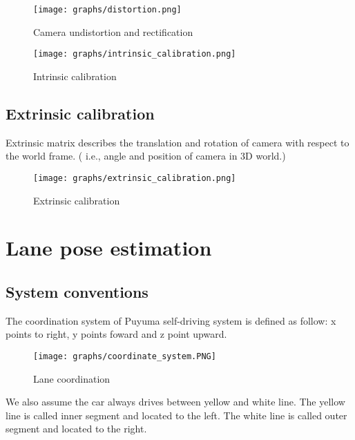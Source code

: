 \documentclass{article}
\begin{document}
\begin{figure}[ht]
  \label{fig:distortion}
  \centering
  \texttt{[image: graphs/distortion.png]}
  \caption{Camera undistortion and rectification}
\end{figure}
\FloatBarrier

\begin{figure}[ht]
  \label{fig:intrinsic_calibration}
  \centering
  \texttt{[image: graphs/intrinsic\_calibration.png]}
  \caption{Intrinsic calibration}
\end{figure}
\FloatBarrier

\subsection{Extrinsic calibration}

Extrinsic matrix describes the translation and rotation of camera with respect to the world frame. ( i.e., angle and position of camera in 3D world.)

\begin{figure}[ht]
  \label{fig:extrinsic_calibration}
  \centering
  \texttt{[image: graphs/extrinsic\_calibration.png]}
  \caption{Extrinsic calibration}
\end{figure}
\FloatBarrier

\clearpage

\section{Lane pose estimation}

\subsection{System conventions}

The coordination system of Puyuma self-driving system is defined as follow: x points to right, y points foward and z point upward.

\begin{figure}[ht]
  \label{fig:lane_coordination}
  \centering
  \texttt{[image: graphs/coordinate\_system.PNG]}
  \caption{Lane coordination}
\end{figure}
\FloatBarrier

\noindent We also assume the car always drives between yellow and white line. The yellow line is called inner segment and located to the left.  The white line is called outer segment and located to the right.
\end{document}
